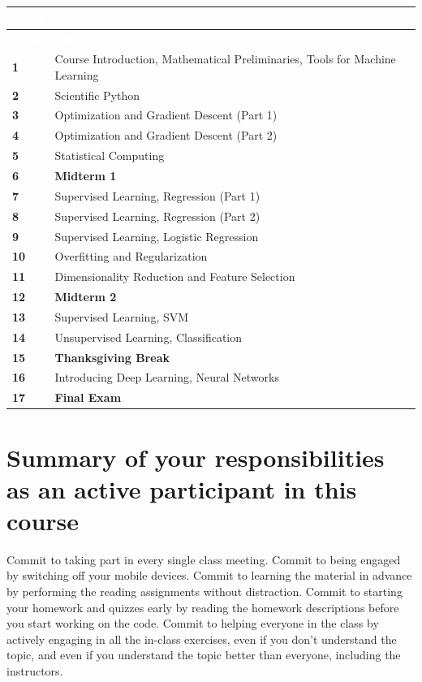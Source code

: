 \documentclass[11pt,oneside,openany]{book}
\begin{document}
{\renewcommand{\arraystretch}{1.35}%
%
\begin{xltabular}{\textwidth}{@{}>{\centering\arraybackslash\bfseries}p{1.8cm} X@{}}
\textcolor{white}{Week} & \textcolor{white}{\bfseries Topics}\\
\endfirsthead
{}\textcolor{white}{Week} & \textcolor{white}{\bfseries Topics}\\
 & Course Introduction, Mathematical Preliminaries, Tools for Machine Learning\\
2 & Scientific Python\\
3 & Optimization and Gradient Descent (Part 1)\\
4 & Optimization and Gradient Descent (Part 2)\\
5 & Statistical Computing\\
 6 & \textbf{Midterm 1}\\
7 & Supervised Learning, Regression (Part 1)\\
8 & Supervised Learning, Regression (Part 2)\\
9 & Supervised Learning, Logistic Regression\\
10 & Overfitting and Regularization\\
11 & Dimensionality Reduction and Feature Selection\\
 12 & \textbf{Midterm 2}\\
13 & Supervised Learning, SVM\\
14 & Unsupervised Learning, Classification\\
 15 & \textbf{Thanksgiving Break}\\
16 & Introducing Deep Learning, Neural Networks\\
 17 & \textbf{Final Exam}\\
\end{xltabular}}

\section*{Summary of your responsibilities as an active participant in this course}
Commit to taking part in every single class meeting. Commit to being engaged by switching off your mobile devices. Commit to learning the material in advance by performing the reading assignments without distraction. Commit to starting your homework and quizzes early by reading the homework descriptions before you start working on the code. Commit to helping everyone in the class by actively engaging in all the in-class exercises, even if you don't understand the topic, and even if you understand the topic better than everyone, including the instructors.
\end{document}
